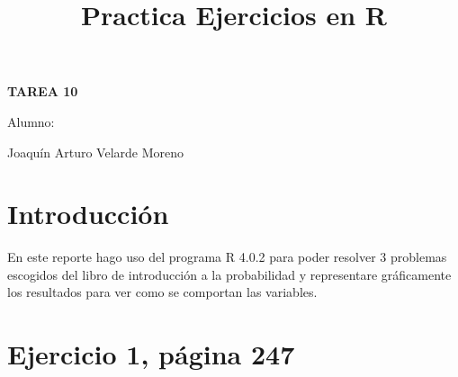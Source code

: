 \documentclass[]{article}
\title{Practica Ejercicios en R}
\date{}
\begin{document}
	\maketitle
	\begin{center}


\centerline{\textbf{TAREA 10} } 
\textbf{ }

\centerline{Alumno: } 
\centerline{Joaquín Arturo Velarde Moreno}


	\end{center}
	

\section{Introducción}
En este reporte hago uso del programa R 4.0.2 \cite{rproject} para poder resolver 3 problemas escogidos del libro de introducción a la probabilidad \cite{Material} y representare gráficamente los resultados para ver como se comportan las variables.


\section{Ejercicio 1, página 247}
\end{document}
